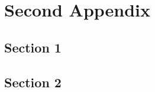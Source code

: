 \chapter{Second Appendix}\label{app:}
  \section{Section 1}\label{sec:}
    \lipsum[34-36]
  \section{Section 2}\label{sec:}
    \lipsum[38]





